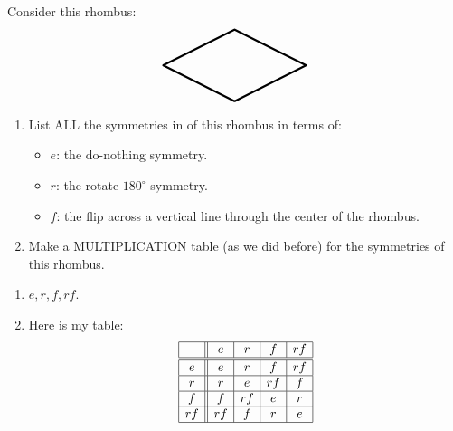 \documentclass[noauthor,nooutcomes,hints,handout]{ximera}
\begin{document}
\begin{question}
  Consider this rhombus:
  \[ 
  \begin{tikzpicture}
    \draw[ultra thick,rounded corners=.05mm] (0,0) -- (2,-1) -- (4,0) -- (2,1)-- cycle;
  \end{tikzpicture}
  \]
  \begin{enumerate}
  \item List ALL the symmetries in of this rhombus in terms of:
    \begin{itemize}
    \item $e$: the do-nothing symmetry.
    \item $r$: the rotate $180^\circ$ symmetry.
    \item $f$: the flip across a vertical line through the center of the rhombus.
    \end{itemize}
  \item Make a MULTIPLICATION table (as we did before) for the
    symmetries of this rhombus.
  \end{enumerate}
  \begin{freeResponse}
    \begin{enumerate}
    \item $e, r,f,rf$.
    \item Here is my table:
             \[
  \begin{array}{|c||c|c|c|c|c|c|}
    \hline
       & e  & r  & f  & rf \\ \hline\hline
    e  & e  & r  & f  & rf \\ \hline
    r  & r  & e  & rf & f \\ \hline
    f  & f  & rf & e  & r \\ \hline
    rf & rf & f  & r  & e \\ \hline
  \end{array}
  \]
    \end{enumerate}
  \end{freeResponse}
\end{question}

\mynewpage
\end{document}
